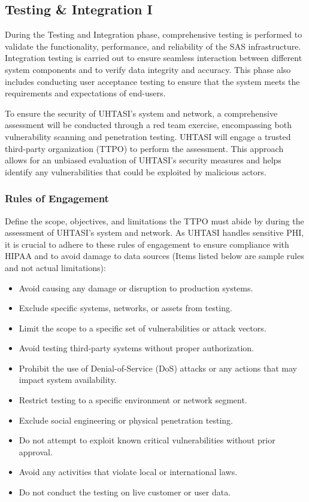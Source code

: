 
\subsection{Testing \& Integration I}

During the Testing and Integration phase, comprehensive testing is performed to validate the functionality, performance, and reliability of the SAS infrastructure. Integration testing is carried out to ensure seamless interaction between different system components and to verify data integrity and accuracy. This phase also includes conducting user acceptance testing to ensure that the system meets the requirements and expectations of end-users.

To ensure the security of UHTASI's system and network, a comprehensive assessment will be conducted through a red team exercise, encompassing both vulnerability scanning and penetration testing. UHTASI will engage a trusted third-party organization (TTPO) to perform the assessment. This approach allows for an unbiased evaluation of UHTASI's security measures and helps identify any vulnerabilities that could be exploited by malicious actors.

\subsubsection{Rules of Engagement}
Define the scope, objectives, and limitations the TTPO must abide by during the assessment of UHTASI's system and network. As UHTASI handles sensitive PHI, it is crucial to adhere to these rules of engagement to ensure compliance with HIPAA and to avoid damage to data sources (Items listed below are sample rules and not actual limitations):

\begin{itemize}
    \item Avoid causing any damage or disruption to production systems.
    \item Exclude specific systems, networks, or assets from testing.
    \item Limit the scope to a specific set of vulnerabilities or attack vectors.
    \item Avoid testing third-party systems without proper authorization.
    \item Prohibit the use of Denial-of-Service (DoS) attacks or any actions that may impact system availability.
    \item Restrict testing to a specific environment or network segment.
    \item Exclude social engineering or physical penetration testing.
    \item Do not attempt to exploit known critical vulnerabilities without prior approval.
    \item Avoid any activities that violate local or international laws.
    \item Do not conduct the testing on live customer or user data.
\end{itemize}

